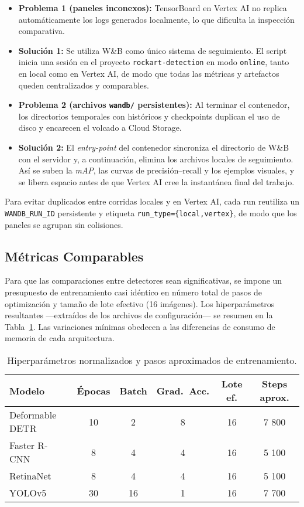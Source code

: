 \begin{itemize}
   \item \textbf{Problema 1 (paneles inconexos):}
   TensorBoard en Vertex AI no replica automáticamente los logs generados localmente, lo que dificulta la inspección comparativa.
   \item \textbf{Solución 1:}
   Se utiliza W\&B como único sistema de seguimiento.
   El script inicia una sesión en el proyecto \texttt{rockart-detection} en modo \texttt{online}, tanto en local como en Vertex AI, de modo que todas las métricas y artefactos queden centralizados y comparables.

   \item \textbf{Problema 2 (archivos \texttt{wandb/} persistentes):}
   Al terminar el contenedor, los directorios temporales con históricos y checkpoints duplican el uso de disco y encarecen el volcado a Cloud Storage.
   \item \textbf{Solución 2:}
   El \emph{entry-point} del contenedor sincroniza el directorio de W\&B con el servidor y, a continuación, elimina los archivos locales de seguimiento.
   Así se suben la \textit{mAP}, las curvas de precisión–recall y los ejemplos visuales, y se libera espacio antes de que Vertex AI cree la instantánea final del trabajo.
\end{itemize}

Para evitar duplicados entre corridas locales y en Vertex AI, cada run reutiliza un \texttt{WANDB\_RUN\_ID} persistente y etiqueta \texttt{run\_type=\{local,vertex\}}, de modo que los paneles se agrupan sin colisiones.

\subsection{Métricas Comparables}\label{ssec:metricas}

Para que las comparaciones entre detectores sean significativas, se impone un presupuesto de entrenamiento casi idéntico en número total de pasos de optimización y tamaño de lote efectivo (16 imágenes).
Los hiperparámetros resultantes —extraídos de los archivos de configuración— se resumen en la Tabla~\ref{tab:train_params}.
Las variaciones mínimas obedecen a las diferencias de consumo de memoria de cada arquitectura.

\begin{table}[!h]
\centering
\caption{Hiperparámetros normalizados y pasos aproximados de entrenamiento.}
\label{tab:train_params}
\begin{tabular}{|l|c|c|c|c|c|}
\hline
\textbf{Modelo} & \textbf{Épocas} & \textbf{Batch} & \textbf{Grad.\ Acc.} & \textbf{Lote ef.} & \textbf{Steps aprox.} \\ \hline
Deformable DETR & 10 & 2  & 8 & 16 & 7 800 \\ \hline
Faster R-CNN    &  8 & 4  & 4 & 16 & 5 100 \\ \hline
RetinaNet       &  8 & 4  & 4 & 16 & 5 100 \\ \hline
YOLOv5          & 30 & 16 & 1 & 16 & 7 700 \\ \hline
\end{tabular}
\end{table}

